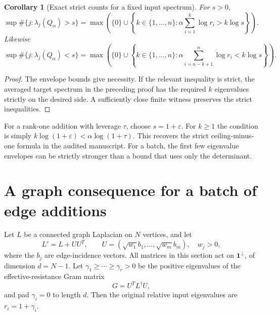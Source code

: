 \documentclass[11pt]{article}
\newtheorem{corollary}[theorem]{Corollary}
\begin{document}
\begin{corollary}[Exact strict counts for a fixed input spectrum]
\label{cor:count}
For $s>0$,
\[
 \sup\#\{j:\lambda_j(Q_\alpha)>s\}
 =\max\left(\{0\}\cup
 \left\{k\in\{1,\ldots,n\}:
 \alpha\sum_{i=1}^k\log r_i>k\log s\right\}\right).
\]
Likewise
\[
 \sup\#\{j:\lambda_j(Q_\alpha)<s\}
 =\max\left(\{0\}\cup
 \left\{k\in\{1,\ldots,n\}:
 \alpha\sum_{i=n-k+1}^n\log r_i<k\log s\right\}\right).
\]
\end{corollary}
\begin{proof}
The envelope bounds give necessity. If the relevant inequality is
strict, the averaged target spectrum in the preceding proof has
the required $k$ eigenvalues strictly on the desired side. A sufficiently
close finite witness preserves the strict inequalities.
\end{proof}

For a rank-one addition with leverage $\tau$, choose $s=1+\varepsilon$.
For $k\ge1$ the condition is simply
$k\log(1+\varepsilon)<\alpha\log(1+\tau)$.
This recovers the strict ceiling-minus-one formula in the audited
manuscript. For a batch, the first few eigenvalue envelopes can be
strictly stronger than a bound that uses only the determinant.

\section{A graph consequence for a batch of edge additions}
Let $L$ be a connected graph Laplacian on $N$ vertices, and let
\[
 L'=L+UU^T,\qquad
 U=(\sqrt{w_1}b_1,\ldots,\sqrt{w_m}b_m),\quad w_j>0,
\]
where the $b_j$ are edge-incidence vectors.
All matrices in this section act on $\mathbf1^\perp$, of dimension
$d=N-1$. Let $\gamma_1\ge\cdots\ge\gamma_r>0$ be the positive
eigenvalues of the effective-resistance Gram matrix
\[
 G=U^TL^\dagger U,
\]
and pad $\gamma_i=0$ to length $d$. Then the original relative
input eigenvalues are $r_i=1+\gamma_i$.
\end{document}
